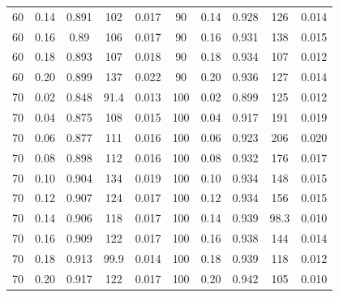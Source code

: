 \documentclass[12pt]{article}
\begin{document}
\begin{table}[h!]
\begin{tabular}{c c | c | c c ||c c | c | c c |}
			60	&	0.14	&	0.891	&	102	&	0.017	&	90	&	0.14	&	0.928	&	126	&	0.014	\\
			60	&	0.16	&	0.89	&	106	&	0.017	&	90	&	0.16	&	0.931	&	138	&	0.015	\\
			60	&	0.18	&	0.893	&	107	&	0.018	&	90	&	0.18	&	0.934	&	107	&	0.012	\\
			60	&	0.20	&	0.899	&	137	&	0.022	&	90	&	0.20	&	0.936	&	127	&	0.014	\\
			70	&	0.02	&	0.848	&	91.4	&	0.013	&	100	&	0.02	&	0.899	&	125	&	0.012	\\
			70	&	0.04	&	0.875	&	108	&	0.015	&	100	&	0.04	&	0.917	&	191	&	0.019	\\
			70	&	0.06	&	0.877	&	111	&	0.016	&	100	&	0.06	&	0.923	&	206	&	0.020	\\
			70	&	0.08	&	0.898	&	112	&	0.016	&	100	&	0.08	&	0.932	&	176	&	0.017	\\
			70	&	0.10	&	0.904	&	134	&	0.019	&	100	&	0.10	&	0.934	&	148	&	0.015	\\
			70	&	0.12	&	0.907	&	124	&	0.017	&	100	&	0.12	&	0.934	&	156	&	0.015	\\
			70	&	0.14	&	0.906	&	118	&	0.017	&	100	&	0.14	&	0.939	&	98.3	&	0.010	\\
			70	&	0.16	&	0.909	&	122	&	0.017	&	100	&	0.16	&	0.938	&	144	&	0.014	\\
			70	&	0.18	&	0.913	&	99.9	&	0.014	&	100	&	0.18	&	0.939	&	118	&	0.012	\\
			70	&	0.20	&	0.917	&	122	&	0.017	&	100	&	0.20	&	0.942	&	105	&	0.010	\\
			\hline
		\end{tabular}
		\end{table}
\end{document}
